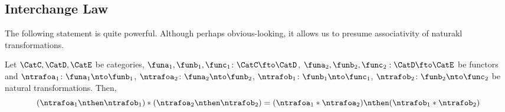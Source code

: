 \subsection{Interchange Law}

The following statement is quite powerful. Although perhaps obvious-looking, it allows us to presume associativity of 
naturakl transformations. 

\begin{proposition}[Interchange]
Let $\CatC, \CatD, \CatE$ be categories, $\funa_1, \funb_1, \func_1\colon\CatC \fto \CatD$, $\funa_2, \funb_2, \func_2:\CatD \fto \CatE$ be functors and $\ntrafoa_1\colon\funa_1\nto\funb_1$, $\ntrafoa_2\colon\funa_2\nto\funb_2$, $\ntrafob_1\colon\funb_1\nto\func_1$, $\ntrafob_2\colon\funb_2\nto\func_2$ be natural transformations. Then, 
\begin{equation}
    (\ntrafoa_1 \nthen \ntrafob_1) * (\ntrafoa_2 \nthen \ntrafob_2) = 
    (\ntrafoa_1 * \ntrafoa_2) \nthen (\ntrafob_1 * \ntrafob_2)
\end{equation}
\end{proposition}

